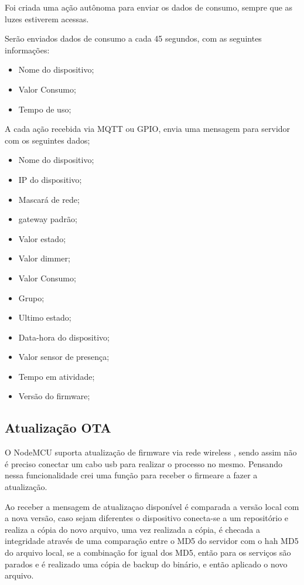 \documentclass[openright]{normas-utf-tex} %
\begin{document}
Foi criada uma ação autônoma para enviar os dados de consumo, sempre que as luzes estiverem acessas. 

Serão enviados dados de consumo a cada 45 segundos, com as seguintes informações:

\begin{itemize}
    \item Nome do dispositivo;
    \item Valor Consumo;
    \item Tempo de uso;
\end{itemize}

A cada ação recebida via MQTT ou GPIO,  envia uma mensagem para servidor com os seguintes dados;

\begin{itemize}
    \item Nome do dispositivo;
    \item IP do dispositivo;
    \item Mascará de rede;
    \item gateway padrão;
    \item Valor estado;
    \item Valor dimmer;
    \item Valor Consumo;
    \item Grupo;
    \item Ultimo estado;
    \item Data-hora do dispositivo;
    \item Valor sensor de presença;
    \item Tempo em atividade;
    \item Versão do firmware;
\end{itemize}

\subsection{Atualização OTA}

O NodeMCU suporta atualização de firmware via rede wireless  \cite{espressif}, sendo assim não é preciso conectar um cabo usb para realizar o processo no mesmo. 
Pensando nessa funcionalidade crei uma função para receber o firmeare a fazer a atualização.

Ao receber a mensagem de atualizaçao disponível é comparada a versão local com a nova versão, caso sejam diferentes o dispositivo conecta-se a um repositório e realiza a cópia do novo arquivo, uma vez realizada a cópia, é checada a integridade através de uma comparação entre o  MD5 do servidor com o hah MD5 do arquivo local, se a combinação for igual dos MD5, então para os serviços são parados e é realizado uma cópia de backup do binário, e então aplicado o novo arquivo.
\end{document}
